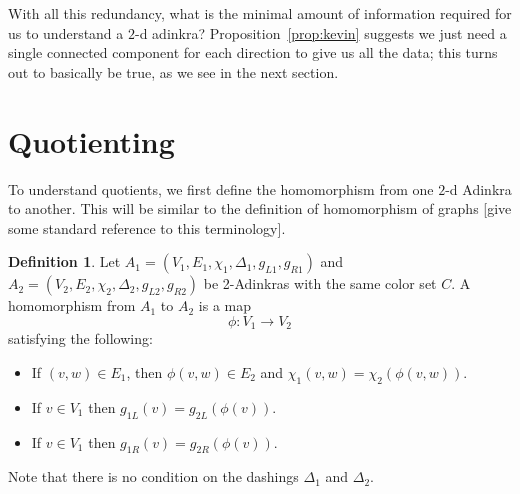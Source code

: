 \documentclass[12pt,twoside,singlespace]{article}
\numberwithin{equation}{section}
\newtheorem{lem}[equation]{Lemma}
\theoremstyle{definition}
\newtheorem{definition}[equation]{Definition}
\newcommand{\ZZ}{\mathbf{Z}}
\begin{document}
With all this redundancy, what is the minimal amount of information required for us to understand a $2$-d adinkra? Proposition~\ref{prop:kevin} suggests we just need a single connected component for each direction to give us all the data; this turns out to basically be true, as we see in the next section.

\begin{comment}
\begin{lem}
\label{lem:square}
In a $2$-d adinkra, suppose we have a path $(x, y \pm_1 1) \rightarrow (x, y) \rightarrow (x \pm_2 1, y)$, where each $\pm_i$ corresponds to a choice of sign, the first and the last vertices are connected to $(x \pm_2 1, y \pm_1 1)$ via the corresponding colors in a square.
\end{lem}
\begin{proof}
Because we have an ($1$-d) adinkra, the two edges in this path correspond to two different colors (WLOG $1$ and $2$ in order) respectively, and if we use the colors $2$ and $1$ in order we must also reach $(x \pm_2 1, y)$ from $(x, y \pm_1 1)$. Because left-moving colors only correspond to $y$-axis moves in the $\ZZ^2$ bigrading, and right-moving colors only correspond to $x$-axis moves, the first move must have displacement $(\pm_2 1, 0)$ and the second move must have displacement $(0, \pm_1)$. This is exactly equivalent to the statement.
\end{proof}
\end{comment}

\begin{comment}



We will worry less about exact rankings right now with the following construction: 

\end{comment}


\section{Quotienting}
To understand quotients, we first define the homomorphism from one $2$-d Adinkra to another.  This will be similar to the definition of homomorphism of graphs [give some standard reference to this terminology].

\begin{definition}
Let 
$A_1=(V_1,E_1,\chi_1,\Delta_1,g_{L1},g_{R1})$
and
$A_2=(V_2,E_2,\chi_2,\Delta_2,g_{L2},g_{R2})$
be 2-Adinkras with the same color set $C$.  A homomorphism from $A_1$ to $A_2$ is a map
\[\phi:V_1\to V_2\]
satisfying the following:
\begin{itemize}
\item If $(v,w)\in E_1$, then $\phi(v,w)\in E_2$ and $\chi_1(v,w)=\chi_2(\phi(v,w))$.
\item If $v\in V_1$ then $g_{1L}(v)=g_{2L}(\phi(v))$.
\item If $v\in V_1$ then $g_{1R}(v)=g_{2R}(\phi(v))$.
\end{itemize}
Note that there is no condition on the dashings $\Delta_1$ and $\Delta_2$.
\end{definition}
\end{document}
